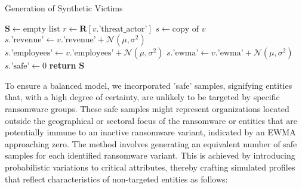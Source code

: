 \documentclass[running heads]{llncs}
\begin{document}
\begin{algorithm}
\caption{Generation of Synthetic Victims}
\begin{algorithmic}[1] %
    \State $\mathbf{S} \gets \text{empty list}$ 
     
         
            \State $r \gets \mathbf{R}[v.\text{'threat\_actor'}]$ 
            \State $s \gets \text{copy of } v$ 
            \State {}
            \State $s.\text{'revenue'} \gets v.\text{'revenue'} + \mathcal{N}(\mu, \sigma^2)$
            \State $s.\text{'employees'} \gets v.\text{'employees'} + \mathcal{N}(\mu, \sigma^2)$
            \State $s.\text{'ewma'} \gets v.\text{'ewma'} + \mathcal{N}(\mu, \sigma^2)$
            \State $s.\text{'safe'} \gets 0$ 
            \State {}
        \EndFor
    \EndFor
    \State \textbf{return} $\mathbf{S}$ 
\EndProcedure
\end{algorithmic}
\end{algorithm}


To ensure a balanced model, we incorporated 'safe' samples, signifying entities that, with a high degree of certainty, are unlikely to be targeted by specific ransomware groups. These safe samples might represent organizations located outside the geographical or sectoral focus of the ransomware or entities that are potentially immune to an inactive ransomware variant, indicated by an EWMA approaching zero. The method involves generating an equivalent number of safe samples for each identified ransomware variant. This is achieved by introducing probabilistic variations to critical attributes, thereby crafting simulated profiles that reflect characteristics of non-targeted entities as follows:
\end{document}
